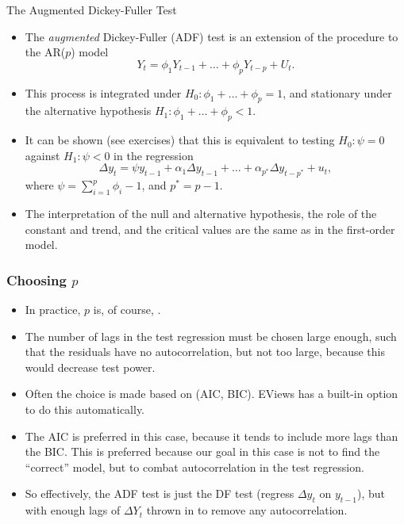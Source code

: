 \begin{frame}{The Augmented Dickey-Fuller Test}
\begin{itemize}

\item The \emph{\color{red}augmented} Dickey-Fuller (ADF) test is an
extension of the procedure to the AR($p$) model
\begin{equation*}
Y_{t}= \phi _{1}Y_{t-1}+\ldots +\phi_{p}Y_{t-p}+ U_{t}.
\end{equation*}%
\item This process is integrated under $H_0: \phi_1 + \ldots + \phi_p = 1$, and
stationary under the alternative hypothesis $H_1: \phi_1 + \ldots + \phi_p <
1$.

\item It can be shown (see exercises) that this is equivalent to testing $H_0: \psi = 0$ against $%
H_1: \psi<0$ in the regression
\begin{equation*}
\Delta y_{t}= \psi y_{t-1}+\alpha _{1} \Delta y_{t-1}+\ldots +\alpha _{p^*}
\Delta y_{t-{p^*}}+ u _{t},
\end{equation*}
where $\psi =\sum_{i=1}^{p}\phi _{i}-1$, and $p^* = p-1$.

\item The interpretation of the null and alternative hypothesis, the role of the
constant and trend, and the critical values are the same as in the
first-order model.
\end{itemize}
\end{frame}
\begin{frame}
\frametitle{Choosing $p$}
\begin{itemize}
\item In practice,  $p$ is, of course, .
\item The number of lags in the test regression must be chosen large enough, such that the residuals
have no autocorrelation, but not too large, because this would
decrease test power.
\item Often the choice is made based on  (AIC, BIC). EViews has a built-in option to
do this automatically.
\item The AIC is preferred in this case, because it tends to include more lags than the BIC. This is preferred because our goal in this case is not to find the ``correct'' model, but to combat autocorrelation in the test regression.
\item So effectively, the ADF test is just the DF test (regress $\Delta y_t$ on $y_{t-1}$), but with enough lags of $\Delta Y_t$ thrown in to remove any autocorrelation.
\end{itemize}
\end{frame}
